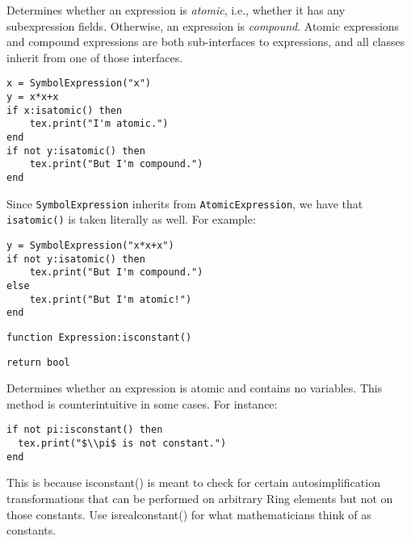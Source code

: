 \documentclass{article}
\newcommand{\coderef}[2]{%
\begin{codehead}[sidebyside,segmentation hidden]%
    \texttt{#1}%
    \tcblower%
    \begin{flushright}%
    \texttt{#2}%
    \end{flushright}%
\end{codehead}%
}
\begin{document}
Determines whether an expression is \emph{atomic}, i.e., whether it has any subexpression fields. Otherwise, an expression is \emph{compound}. Atomic expressions and compound expressions are both sub-interfaces to expressions, and all classes inherit from one of those interfaces.

\begin{codebox}
    \begin{verbatim}
x = SymbolExpression("x")
y = x*x+x
if x:isatomic() then 
    tex.print("I'm atomic.")
end 
if not y:isatomic() then 
    tex.print("But I'm compound.")
end
\end{verbatim}
\tcblower
{}
\end{codebox}
Since \texttt{SymbolExpression} inherits from \texttt{AtomicExpression}, we have that \texttt{isatomic()} is taken literally as well. For example:
\begin{codebox}
    \begin{verbatim}
y = SymbolExpression("x*x+x")
if not y:isatomic() then 
    tex.print("But I'm compound.")
else
    tex.print("But I'm atomic!")
end
\end{verbatim}
\tcblower
{}
\end{codebox}
\vskip 0.2cm

\coderef{function Expression:isconstant()}{return bool}

Determines whether an expression is atomic and contains no variables. This method is counterintuitive in some cases. For instance:

\begin{codebox}
    \begin{verbatim}
if not pi:isconstant() then 
  tex.print("$\\pi$ is not constant.")
end  
\end{verbatim}
\tcblower
{}
\end{codebox}
This is because {\ttfamily isconstant()} is meant to check for certain autosimplification  transformations that can be performed on arbitrary {\ttfamily Ring} elements but not on those constants. Use {\ttfamily isrealconstant()} for what mathematicians think of as constants.
\end{document}
